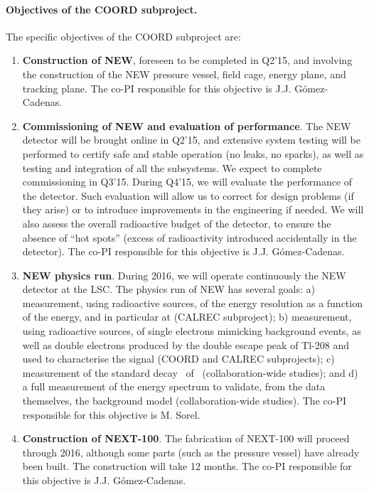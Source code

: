 \paragraph{Objectives of the COORD subproject.}
The specific objectives of the COORD subproject are:

\begin{enumerate}
\item {\bf Construction of NEW}, foreseen to be completed in Q2'15, and involving the construction of the NEW pressure vessel, field cage, energy plane, and tracking plane. The co-PI responsible for this objective is J.J. G\'omez-Cadenas.

\item {\bf Commissioning of NEW and evaluation of performance}. The NEW detector will be brought online in Q2'15, and extensive system testing will be performed to certify safe and stable operation (no leaks, no sparks), as well as testing and integration of all the subsystems. We expect to complete commissioning in Q3'15. During Q4'15, we will evaluate the performance of the detector. Such evaluation will allow us to correct for design problems (if they arise) or to introduce improvements in the engineering if needed. We will also assess the overall radioactive budget of the detector, to ensure the absence of ``hot spots'' (excess of radioactivity introduced accidentally in the detector). The co-PI responsible for this objective is J.J. G\'omez-Cadenas.

\item {\bf NEW physics run}. During 2016, we will operate continuously the NEW detector at the LSC. The physics run of NEW has several goals: a) measurement, using radioactive sources, of the energy resolution as a function of the energy, and in particular at \Qbb (CALREC subproject); b) measurement, using radioactive sources, of single electrons mimicking background events, as well as double electrons produced by the double escape peak of Tl-208 and used to characterise the signal (COORD and CALREC subprojects); c) measurement of the standard decay \bbtnu\ of \XE\ (collaboration-wide studies); and d) a full measurement of the energy spectrum to validate, from the data themselves, the background model (collaboration-wide studies). The co-PI responsible for this objective is M. Sorel.
%

\item {\bf Construction of NEXT-100}. The fabrication of NEXT-100 will proceed through 2016, although some parts (such as the pressure vessel) have already been built. The construction will take 12 months. The co-PI responsible for this objective is J.J. G\'omez-Cadenas. 


\end{enumerate}
